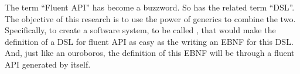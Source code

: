 The term ``Fluent API'' has become a buzzword.  So has the related term
``DSL''.  The objective of this research is to use the power of \Java generics
to combine the two.  Specifically, to create a software system, to be called
\SELF, that would make the definition of a DSL for fluent API as easy as the
writing an EBNF for this DSL. And, just like an ouroboros, the definition of this
EBNF will be through a fluent API generated by \SELF itself.
